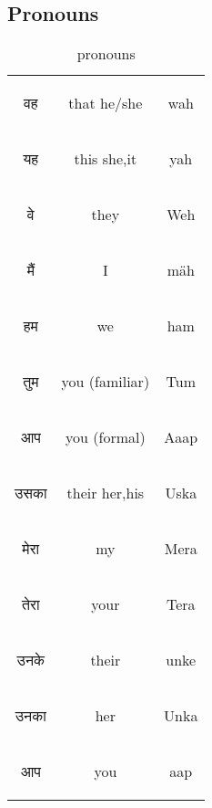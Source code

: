 \subsection{Pronouns}
\begin{table}[H]
    \centering
    \begin{tabular}{c|c|c}
    \begin{hindi} वह \end{hindi} & that he/she & wah \\
    \begin{hindi} यह \end{hindi} & this she,it& yah \\
    \begin{hindi} वे \end{hindi} & they &  Weh \\
    \begin{hindi} मैं \end{hindi} & I & mäh \\    
    \begin{hindi} हम \end{hindi} &  we & ham \\    
    \begin{hindi} तुम \end{hindi} &  you (familiar) & Tum\\    
    \begin{hindi} आप \end{hindi} &  you (formal) & Aaap \\    
    \begin{hindi} उसका  \end{hindi} & their her,his  & Uska \\    
    \begin{hindi} मेरा \end{hindi} &  my & Mera \\    
    \begin{hindi} तेरा \end{hindi} &  your & Tera \\    
    \begin{hindi} उनके \end{hindi} & their & unke \\
    \begin{hindi} उनका \end{hindi} & her & Unka \\
    \begin{hindi} आप \end{hindi} & you & aap \\
    \end{tabular}
    \caption{pronouns}    
    \label{tab:pronouns}
\end{table}


